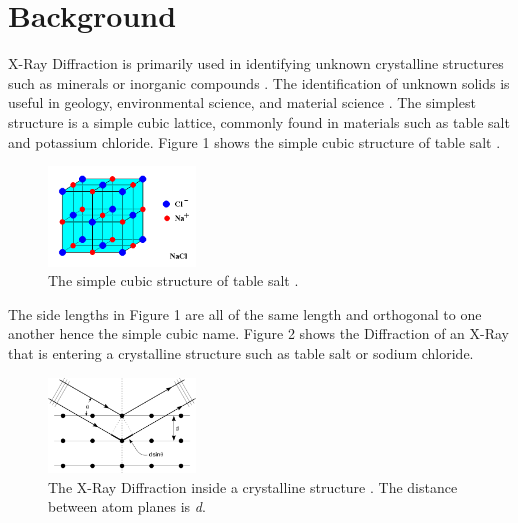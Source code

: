 \documentclass[twocolumn]{article}
\begin{document}
\section*{Background}
X-Ray Diffraction is primarily used in identifying unknown crystalline structures such as minerals or inorganic compounds \cite{XRDDiffrac}. The identification of unknown solids is useful in geology, environmental science, and material science \cite{Qian}. The simplest structure is a simple cubic lattice, commonly found in materials such as table salt and potassium chloride. Figure 1 shows the simple cubic structure of table salt \cite{Ou}.
\begin{figure}[htbp]
\begin{center}
\includegraphics[width=0.35\textwidth]{Figures/PHYS 331 XRD Report Simple Cubic Rock Salt.png}
\caption{The simple cubic structure of table salt \cite{Ou}.}
\label{Fig1}
\end{center}
\end{figure}
\newpage
The side lengths in Figure 1 are all of the same length and orthogonal to one another hence the simple cubic name. Figure 2 shows the Diffraction of an X-Ray that is entering a crystalline structure such as table salt or sodium chloride.
\begin{figure}[htbp]
\begin{center}
\includegraphics[width=0.35\textwidth]{Figures/PHYS 331 XRD Report XRD.png}
\caption{The X-Ray Diffraction inside a crystalline structure \cite{X-RayCryst}. The distance between atom planes is \textit{d}.}
\label{Fig2}
\end{center}
\end{figure}
\end{document}

